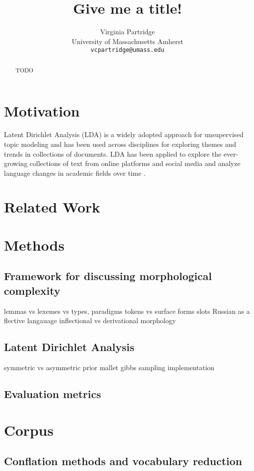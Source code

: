 \documentclass[11pt,a4paper]{article}
\title{Give me a title!}
\author{Virginia Partridge \\
  University of Massachusetts Amherst\\
  \texttt{vcpartridge@umass.edu}
}
\date{}
\begin{document}
\maketitle
\begin{abstract}
TODO
\end{abstract}

\section{Motivation}
Latent Dirichlet Analysis (LDA) is a widely adopted approach for unsupervised topic modeling and has been used across disciplines for exploring themes and trends in collections of documents. LDA has been applied to explore the ever-growing collections of text from online platforms and social media and analyze language changes in academic fields over time \cite{koltsova2013, mcfarland2013differentiating,vogel-jurafsky-2012-said,mitrofanova2015probabilistic}.
\section{Related Work}

\section{Methods}
\subsection{Framework for discussing morphological complexity}
lemmas vs lexemes vs types, paradigms
tokens vs surface forms
slots
Russian as a flective langauage
inflectional vs derivational morphology

\subsection{Latent Dirichlet Analysis}
symmetric vs asymmetric prior
mallet gibbs sampling implementation

\subsection{Evaluation metrics}

\section{Corpus}
\subsection{Conflation methods and vocabulary reduction}




\end{document}
